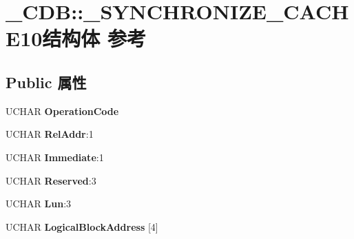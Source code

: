 \hypertarget{struct___c_d_b_1_1___s_y_n_c_h_r_o_n_i_z_e___c_a_c_h_e10}{}\section{\+\_\+\+C\+DB\+:\+:\+\_\+\+S\+Y\+N\+C\+H\+R\+O\+N\+I\+Z\+E\+\_\+\+C\+A\+C\+H\+E10结构体 参考}
\label{struct___c_d_b_1_1___s_y_n_c_h_r_o_n_i_z_e___c_a_c_h_e10}
\subsection*{Public 属性}
\begin{DoxyCompactItemize}
\item 
\mbox{\label{struct___c_d_b_1_1___s_y_n_c_h_r_o_n_i_z_e___c_a_c_h_e10_a11e9da2ba08e93d2bb74bbef31010f82}} 
U\+C\+H\+AR {\bfseries Operation\+Code}
\item 
\mbox{\label{struct___c_d_b_1_1___s_y_n_c_h_r_o_n_i_z_e___c_a_c_h_e10_a3ce62bc1a15eb0e9797a1008c62e5247}} 
U\+C\+H\+AR {\bfseries Rel\+Addr}\+:1
\item 
\mbox{\label{struct___c_d_b_1_1___s_y_n_c_h_r_o_n_i_z_e___c_a_c_h_e10_a394f7a72837e0d6c682db7a4312a8934}} 
U\+C\+H\+AR {\bfseries Immediate}\+:1
\item 
\mbox{\label{struct___c_d_b_1_1___s_y_n_c_h_r_o_n_i_z_e___c_a_c_h_e10_a78fc457ef303dceb89f353b4292256bd}} 
U\+C\+H\+AR {\bfseries Reserved}\+:3
\item 
\mbox{\label{struct___c_d_b_1_1___s_y_n_c_h_r_o_n_i_z_e___c_a_c_h_e10_a3ed177d92223c317e5b29e02f29f1594}} 
U\+C\+H\+AR {\bfseries Lun}\+:3
\item 
\mbox{\label{struct___c_d_b_1_1___s_y_n_c_h_r_o_n_i_z_e___c_a_c_h_e10_a67ac10eb060d7bbb4ab9530258ea84e2}} 
U\+C\+H\+AR {\bfseries Logical\+Block\+Address} \mbox{[}4\mbox{]}

\end{DoxyCompactItemize}
